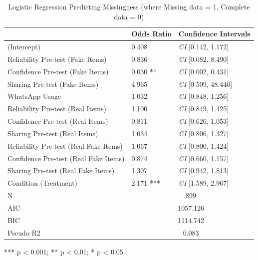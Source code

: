\documentclass[empirical, authordate, issue]{jote-new-article}
\begin{document}
\begin{table}[h!]

  \caption{Logistic Regression Predicting Missingness (where Missing data = 1, Complete data = 0) }
  \label{tab:tableS1}


  \begin{tabularx}{\linewidth}{@{} X  l  l@{}}

    \toprule                               & Odds Ratio                   & Confidence Intervals      \\
    \midrule
    (Intercept)                            & 0.408                        & \emph{CI} [0.142, 1.172]  \\
    Reliability Pre-test (Fake Items)      & 0.836                        & \emph{CI} [0.082, 8.490]  \\
    Confidence Pre-test (Fake Items)       & 0.030 **                     & \emph{CI} [0.002, 0.431]  \\
    Sharing Pre-test (Fake Items)          & 4.965                        & \emph{CI} [0.509, 48.440] \\
    \mbox{WhatsApp} Usage                  & 1.032                        & \emph{CI} [0.848, 1.256]  \\
    Reliability Pre-test (Real Items)      & 1.100                        & \emph{CI} [0.849, 1.425]  \\
    Confidence Pre-test (Real Items)       & 0.811                        & \emph{CI} [0.626, 1.053]  \\
    Sharing Pre-test (Real Items)          & 1.034                        & \emph{CI} [0.806, 1.327]  \\
    Reliability Pre-test (Real Fake Items) & 1.067                        & \emph{CI} [0.800, 1.424]  \\
    Confidence Pre-test (Real Fake Items)  & 0.874                        & \emph{CI} [0.660, 1.157]  \\
    Sharing Pre-test (Real Fake Items)     & 1.307                        & \emph{CI} [0.942, 1.813]  \\
    Condition (Treatment)                  & 2.171 ***                    & \emph{CI} [1.589, 2.967]  \\
    \midrule
    N                                      & \multicolumn{2}{c}{899}                                  \\
    AIC                                    & \multicolumn{2}{c}{1057.126}                             \\
    BIC                                    & \multicolumn{2}{c}{1114.742}                             \\
    Pseudo R2                              & \multicolumn{2}{c}{0.083}                                \\
    \bottomrule
  \end{tabularx}
  *** p < 0.001; ** p < 0.01; * p < 0.05.


\end{table}
\end{document}
